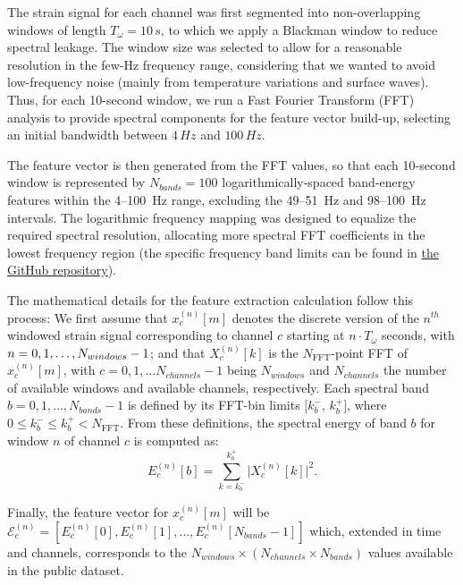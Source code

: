 \documentclass[11pt]{article}
\begin{document}
The strain signal for each channel was first segmented into non-overlapping windows of length $T_\omega=10\,s$, to which we apply a Blackman window to reduce spectral leakage. The window size was selected to allow for a reasonable resolution in the few-Hz frequency range, considering that we wanted to avoid low-frequency noise (mainly from temperature variations and surface waves). Thus, for each 10-second window, we run a Fast Fourier Transform (FFT) analysis to provide spectral components for the feature vector build-up, selecting an initial bandwidth between $4\,Hz$ and $100\,Hz$.

The feature vector is then generated from the FFT values, so that each 10-second window is represented by $N_{bands}=100$ logarithmically-spaced band-energy features within the 4--100~Hz range, excluding the 49--51~Hz and 98--100~Hz intervals. The logarithmic frequency mapping was designed to equalize the required spectral resolution, allocating more spectral FFT coefficients in the lowest frequency region (the specific frequency band limits can be found in \href{https://github.com/UAH-PSI/das-vessel-detection/blob/main/data/fbands.csv}{the GitHub repository}).

The mathematical details for the feature extraction calculation follow this process: We first assume that $x_c^{(n)}[m]$ denotes the discrete version of the $n^{th}$ windowed strain signal corresponding to channel $c$ starting at $n \cdot T_\omega$ seconds, with $n\nobreak=0, 1, \dots, N_{windows}-1$; and that $X_c^{(n)}[k]$ is the $N_{\mathrm{FFT}}$-point FFT of $x_c^{(n)}[m]$, with $c=0,1,\dots N_{channels}-1$ being $N_{windows}$ and $N_{channels}$ the number of available windows and available channels, respectively. Each spectral band $b = 0, 1, \dots, N_{bands}-1$ is defined by its FFT-bin limits $\big[k_b^{-},\, k_b^{+}\big]$, where $0 \le k_b^{-} \le k_b^{+} < N_{\mathrm{FFT}}$.
From these definitions, the spectral energy of band $b$ for window $n$ of channel $c$ is computed as:
\begin{equation}
E_c^{(n)}[b] = \sum_{k = k_b^{-}}^{k_b^{+}} \big| X_c^{(n)}[k] \big|^2.
\end{equation}

Finally, the feature vector for $x_c^{(n)}[m]$ will be $\mathcal{E}_c^{(n)}=\left[ E_c^{(n)}[0], E_c^{(n)}[1], \dots, E_c^{(n)}[N_{bands}-1] \right]$ which, extended in time and channels, corresponds to the $N_{windows}\times \left( N_{channels}\times N_{bands}\right)$ values available in the public dataset.
\end{document}
